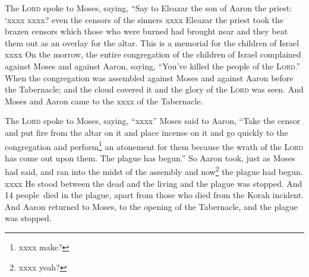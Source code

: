 
\begin{inparaenum}
     The \textsc{Lord} spoke to Moses, saying,%
     ``Say to Eleazar the son of Aaron the priest: `xxxx%
     xxxx? even the censors of the sinners xxxx%
     Eleazar the priest took the brazen censors which those who were burned had brought near and they beat them out as an overlay for the altar.%
     This is a memorial for the children of Israel xxxx%
     On the morrow, the entire congregation of the children of Israel complained against Moses and against Aaron, saying, ``You've killed the people of the \textsc{Lord}.''%
     When the congregation was assembled against Moses and against Aaron before the Tabernacle; and the cloud covered it and the glory of the \textsc{Lord} was seen.%
     And Moses and Aaron came to the xxxx of the Tabernacle.%
    
     The \textsc{Lord} spoke to Moses, saying,%
     ``xxxx''%
     Moses said to Aaron, ``Take the censor and put fire from the altar on it and place incense on it and go quickly to the congregation and perform\footnote{xxxx make?} an atonement for them because the wrath of the \textsc{Lord} has come out upon them. The plague has begun.''%
     So Aaron took, just as Moses had said, and ran into the midst of the assembly and now\footnote{xxxx yeah?} the plague had begun. xxxx%
     He stood between the dead and the living and the plague was stopped.%
     And 14 people\understood\ died in the plague, apart from those who died from the Korah incident.%
     And Aaron returned to Moses, to the opening of the Tabernacle, and the plague was stopped.%
    

\end{inparaenum}
